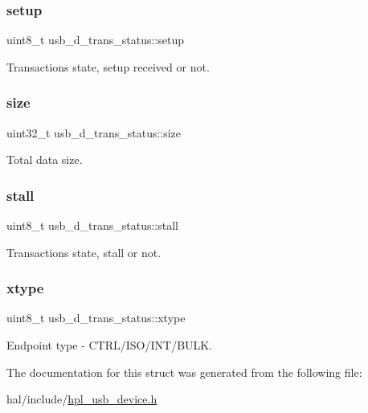 \subsubsection{\texorpdfstring{setup}{setup}}
{\footnotesize\ttfamily uint8\+\_\+t usb\+\_\+d\+\_\+trans\+\_\+status\+::setup}

Transactions state, setup received or not. \mbox{\label{structusb__d__trans__status_ad2e40329b15fb1747b2cccee380838f3}} 
\subsubsection{\texorpdfstring{size}{size}}
{\footnotesize\ttfamily uint32\+\_\+t usb\+\_\+d\+\_\+trans\+\_\+status\+::size}

Total data size. \mbox{\label{structusb__d__trans__status_a8895af5fe5956a00b78c420d4d698f11}} 
\subsubsection{\texorpdfstring{stall}{stall}}
{\footnotesize\ttfamily uint8\+\_\+t usb\+\_\+d\+\_\+trans\+\_\+status\+::stall}

Transactions state, stall or not. \mbox{\label{structusb__d__trans__status_a94aa357a9ed58c36355ea18097b22ee2}} 
\subsubsection{\texorpdfstring{xtype}{xtype}}
{\footnotesize\ttfamily uint8\+\_\+t usb\+\_\+d\+\_\+trans\+\_\+status\+::xtype}

Endpoint type -\/ C\+T\+R\+L/\+I\+S\+O/\+I\+N\+T/\+B\+U\+LK. 

The documentation for this struct was generated from the following file\+:\begin{DoxyCompactItemize}
\item 
hal/include/\hyperlink{hpl__usb__device_8h}{hpl\+\_\+usb\+\_\+device.\+h}\end{DoxyCompactItemize}
